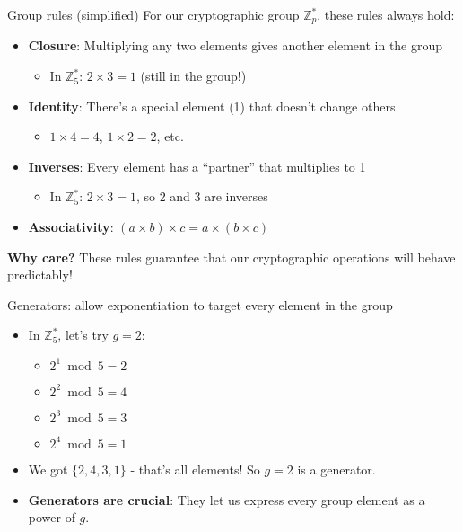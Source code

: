 \documentclass[aspectratio=169, lualatex, handout]{beamer}
\begin{document}
\begin{frame}{Group rules (simplified)}
	For our cryptographic group $\mathbb{Z}_p^*$, these rules always hold:
	\begin{itemize}[<+->]
		\item \textbf{Closure}: Multiplying any two elements gives another element in the group
		      \begin{itemize}
			      \item In $\mathbb{Z}_5^*$: $2 \times 3 = 1$ (still in the group!)
		      \end{itemize}
		\item \textbf{Identity}: There's a special element (1) that doesn't change others
		      \begin{itemize}
			      \item $1 \times 4 = 4$, $1 \times 2 = 2$, etc.
		      \end{itemize}
		\item \textbf{Inverses}: Every element has a ``partner'' that multiplies to 1
		      \begin{itemize}
			      \item In $\mathbb{Z}_5^*$: $2 \times 3 = 1$, so 2 and 3 are inverses
		      \end{itemize}
		\item \textbf{Associativity}: $(a \times b) \times c = a \times (b \times c)$
	\end{itemize}
	\vspace{0.5cm}
	\textbf{Why care?} These rules guarantee that our cryptographic operations will behave predictably!
\end{frame}

\begin{frame}{Generators: allow exponentiation to target every element in the group}
	\begin{itemize}[<+->]
		\item In $\mathbb{Z}_5^*$, let's try $g = 2$:
		      \begin{itemize}
			      \item $2^1 \bmod 5 = 2$
			      \item $2^2 \bmod 5 = 4$
			      \item $2^3 \bmod 5 = 3$
			      \item $2^4 \bmod 5 = 1$
		      \end{itemize}
		\item We got $\{2, 4, 3, 1\}$ - that's all elements! So $g = 2$ is a generator.
		\item \textbf{Generators are crucial}: They let us express every group element as a power of $g$.
	\end{itemize}
\end{frame}
\end{document}
